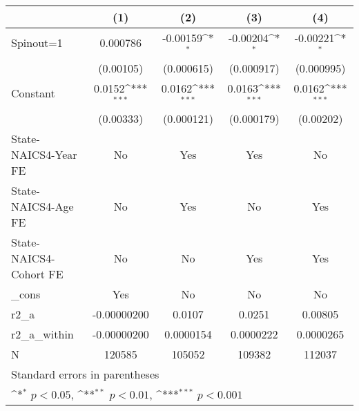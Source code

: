 {
\def\sym#1{\ifmmode^{#1}\else\(^{#1}\)\fi}
\begin{tabular}{l*{4}{c}}
\hline\hline
                    &\multicolumn{1}{c}{(1)}         &\multicolumn{1}{c}{(2)}         &\multicolumn{1}{c}{(3)}         &\multicolumn{1}{c}{(4)}         \\
\hline
Spinout=1           &    0.000786         &    -0.00159\sym{*}  &    -0.00204\sym{*}  &    -0.00221\sym{*}  \\
                    &   (0.00105)         &  (0.000615)         &  (0.000917)         &  (0.000995)         \\
[1em]
Constant            &      0.0152\sym{***}&      0.0162\sym{***}&      0.0163\sym{***}&      0.0162\sym{***}\\
                    &   (0.00333)         &  (0.000121)         &  (0.000179)         &   (0.00202)         \\
[1em]
State-NAICS4-Year FE&          No         &         Yes         &         Yes         &          No         \\
[1em]
State-NAICS4-Age FE &          No         &         Yes         &          No         &         Yes         \\
[1em]
State-NAICS4-Cohort FE&          No         &          No         &         Yes         &         Yes         \\
[1em]
\_cons              &         Yes         &          No         &          No         &          No         \\
\hline
r2\_a                & -0.00000200         &      0.0107         &      0.0251         &     0.00805         \\
r2\_a\_within         & -0.00000200         &   0.0000154         &   0.0000222         &   0.0000265         \\
N                   &      120585         &      105052         &      109382         &      112037         \\
\hline\hline
\multicolumn{5}{l}{\footnotesize Standard errors in parentheses}\\
\multicolumn{5}{l}{\footnotesize \sym{*} \(p<0.05\), \sym{**} \(p<0.01\), \sym{***} \(p<0.001\)}\\
\end{tabular}
}
